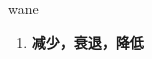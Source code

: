 
\begin{frame}
{\huge wane}
\begin{center}
\begin{enumerate}\Large
  \item \textbf{减少，衰退，降低}
\end{enumerate}
\end{center}
\end{frame}
